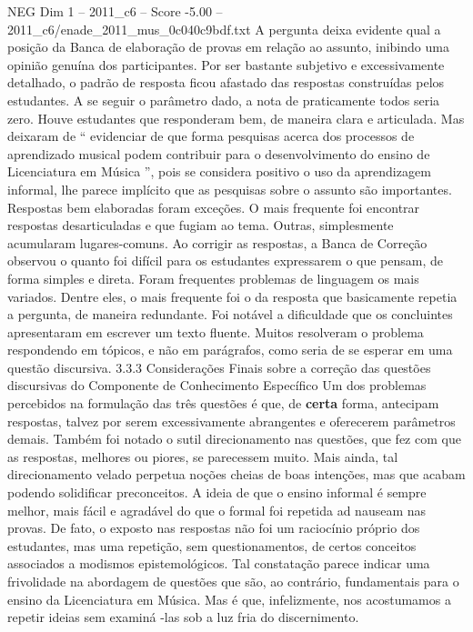 \begin{textsample}{NEG Dim 1 – 2011\_c6 – Score -5.00 – 2011\_c6/enade\_2011\_mus\_0c040c9bdf.txt}
A pergunta deixa evidente qual a posição da Banca de elaboração de provas em relação ao assunto, inibindo uma opinião genuína dos participantes.
Por ser bastante subjetivo e excessivamente detalhado, o padrão de resposta ficou afastado das respostas construídas pelos estudantes.
A se seguir o parâmetro dado, a nota de praticamente todos seria zero.
Houve estudantes que responderam bem, de maneira clara e articulada.
Mas deixaram de “ evidenciar de que forma pesquisas acerca dos processos de aprendizado musical podem contribuir para o desenvolvimento do ensino de Licenciatura em Música ”, pois se considera positivo o uso da aprendizagem informal, lhe parece implícito que as pesquisas sobre o assunto são importantes.
Respostas bem elaboradas foram exceções.
O mais frequente foi encontrar respostas desarticuladas e que fugiam ao tema.
Outras, simplesmente acumularam lugares-comuns.
Ao corrigir as respostas, a Banca de Correção observou o quanto foi difícil para os estudantes expressarem o que pensam, de forma simples e direta.
Foram frequentes problemas de linguagem os mais variados.
Dentre eles, o mais frequente foi o da resposta que basicamente repetia a pergunta, de maneira redundante.
Foi notável a dificuldade que os concluintes apresentaram em escrever um texto fluente.
Muitos resolveram o problema respondendo em tópicos, e não em parágrafos, como seria de se esperar em uma questão discursiva. 3.3.3 Considerações Finais sobre a correção das questões discursivas do Componente de Conhecimento Específico Um dos problemas percebidos na formulação das três questões é que, de \textbf{certa} forma, antecipam respostas, talvez por serem excessivamente abrangentes e oferecerem parâmetros demais.
Também foi notado o sutil direcionamento nas questões, que fez com que as respostas, melhores ou piores, se parecessem muito.
Mais ainda, tal direcionamento velado perpetua noções cheias de boas intenções, mas que acabam podendo solidificar preconceitos.
A ideia de que o ensino informal é sempre melhor, mais fácil e agradável do que o formal foi repetida ad nauseam nas provas.
De fato, o exposto nas respostas não foi um raciocínio próprio dos estudantes, mas uma repetição, sem questionamentos, de certos conceitos associados a modismos epistemológicos.
Tal constatação parece indicar uma frivolidade na abordagem de questões que são, ao contrário, fundamentais para o ensino da Licenciatura em Música.
Mas é que, infelizmente, nos acostumamos a repetir ideias sem examiná -las sob a luz fria do discernimento.

\end{textsample}
